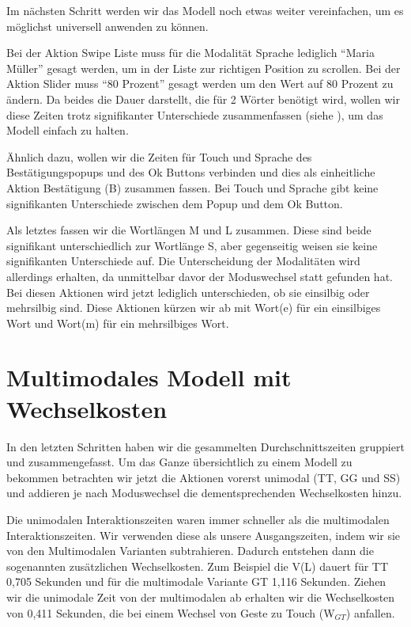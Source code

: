 Im nächsten Schritt werden wir das Modell noch etwas weiter vereinfachen, um es möglichst universell anwenden zu können. 

Bei der Aktion Swipe Liste muss für die Modalität Sprache lediglich "`Maria Müller"' gesagt werden, um in der Liste zur richtigen Position zu scrollen. Bei der Aktion Slider muss "`80 Prozent"' gesagt werden um den Wert auf 80 Prozent zu ändern. Da beides die Dauer darstellt, die für 2 Wörter benötigt wird, wollen wir diese Zeiten trotz signifikanter Unterschiede zusammenfassen (siehe ), um das Modell einfach zu halten. 

Ähnlich dazu, wollen wir die Zeiten für Touch und Sprache des Bestätigungspopups und des Ok Buttons verbinden und dies als einheitliche Aktion Bestätigung (B) zusammen fassen. Bei Touch und Sprache gibt keine signifikanten Unterschiede zwischen dem Popup und dem Ok Button.

Als letztes fassen wir die Wortlängen M und L zusammen. Diese sind beide signifikant unterschiedlich zur Wortlänge S, aber gegenseitig weisen sie keine signifikanten Unterschiede auf. Die Unterscheidung der Modalitäten wird allerdings erhalten, da unmittelbar davor der Moduswechsel statt gefunden hat. Bei diesen Aktionen wird jetzt lediglich unterschieden, ob sie einsilbig oder mehrsilbig sind. Diese Aktionen kürzen wir ab mit Wort(e) für ein einsilbiges Wort und Wort(m) für ein mehrsilbiges Wort.

\section[Multimodales Modell]{Multimodales Modell mit Wechselkosten}
In den letzten Schritten haben wir die gesammelten Durchschnittszeiten gruppiert und zusammengefasst. Um das Ganze übersichtlich zu einem Modell zu bekommen betrachten wir jetzt die Aktionen vorerst unimodal (TT, GG und SS) und addieren je nach Moduswechsel die dementsprechenden Wechselkosten hinzu. 

Die unimodalen Interaktionszeiten waren immer schneller als die multimodalen Interaktionszeiten. Wir verwenden diese als unsere Ausgangszeiten, indem wir sie von den Multimodalen Varianten subtrahieren. Dadurch entstehen dann die sogenannten zusätzlichen Wechselkosten. Zum Beispiel die V(L) dauert für TT 0,705 Sekunden und für die multimodale Variante GT 1,116 Sekunden. Ziehen wir die unimodale Zeit von der multimodalen ab erhalten wir die Wechselkosten von 0,411 Sekunden, die bei einem Wechsel von Geste zu Touch (W$_{GT}$) anfallen. 

